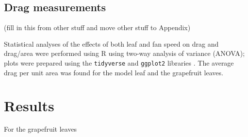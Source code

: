 \documentclass{article}
\begin{document}
\subsection{Drag measurements}
(fill in this from other stuff and move other stuff to Appendix)


Statistical analyses of the effects of both leaf and fan speed on drag and drag/area were performed using R \citep{r2020} using two-way analysis of variance (ANOVA); plots were prepared using the \lstinline{tidyverse} and \lstinline{ggplot2} libraries \citep{wickham2019tidyverse}. The average drag per unit area was found for the model leaf and the grapefruit leaves.

\section{Results}
For the grapefruit leaves 
\end{document}

